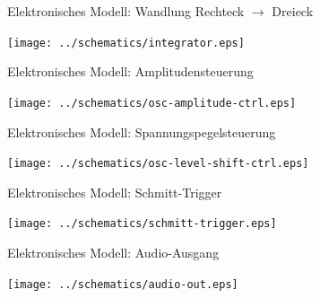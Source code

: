 \documentclass{beamer}
\begin{document}
\begin{frame}[fragile]{Elektronisches Modell: Wandlung Rechteck $\rightarrow$ Dreieck}
  \begin{center}
    \texttt{[image: ../schematics/integrator.eps]}
  \end{center}
\end{frame}

\begin{frame}[fragile]{Elektronisches Modell: Amplitudensteuerung}
  \begin{center}
    \texttt{[image: ../schematics/osc-amplitude-ctrl.eps]}
  \end{center}
\end{frame}

\begin{frame}[fragile]{Elektronisches Modell: Spannungspegelsteuerung}
  \begin{center}
    \texttt{[image: ../schematics/osc-level-shift-ctrl.eps]}
  \end{center}
\end{frame}

\begin{frame}[fragile]{Elektronisches Modell: Schmitt-Trigger}
  \begin{center}
    \texttt{[image: ../schematics/schmitt-trigger.eps]}
  \end{center}
\end{frame}

\begin{frame}[fragile]{Elektronisches Modell: Audio-Ausgang}
  \begin{center}
    \texttt{[image: ../schematics/audio-out.eps]}
  \end{center}
\end{frame}
\end{document}
